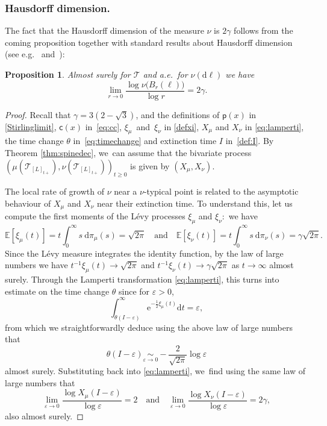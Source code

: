 \documentclass[JEP,XML,SOM,Unicode,NoFloatCountersInSection, NoEqCountersInSection,published]{cedram}
\let\dH\gamma
\newcommand{\pp}{\mathsf{p}}
\newcommand{\cc}{\mathsf{c}}\let\ff\cc
\newcommand{\T}{\mathcal{T}}\let\CRT\T\let\tbr\T
\let\veps\varepsilon
\newtheorem{prop}[thm]{Proposition}
\theoremstyle{definition}
\begin{document}
\subsubsection*{Hausdorff dimension.}

The fact that the Hausdorff dimension of the measure $\nu$ is $2 \dH$ follows from the coming proposition together with standard results about Hausdorff dimension (see e.g.~\cite[Lem.\,4.1]{lyons1995ergodic} and~\cite[\S 14]{billingsley1965}):

\begin{prop}\label{prop:continuous Hausdorff} Almost surely for $\mathcal{T}$ and a.e.\ for $\nu(\mathrm{d}\ell)$ we have
\[
\lim_{r \to 0} \frac{\log \nu \big(B_r(\ell)\big) }{\log r} = 2 \dH.
\]
\end{prop}

\begin{proof}
Recall that $\gamma=3(2-\sqrt{3})$, and the definitions of $\pp(x)$ in \eqref{Stirlinglimit}, $\cc(x)$ in~\eqref{eq:cc}, $\xi_\mu$~and~$\xi_\nu$ in \eqref{defxi}, $X_\mu$ and $X_\nu$ in \eqref{eq:lamperti}, the time change $\theta$ in~\eqref{eq:timechange} and extinction time $I$ in~\eqref{def:I}. By Theorem \ref{thm:spinedec}, we~can assume that the bivariate process $(\mu(\T_{[L]_{t+}}),\nu(\T_{[L]_{t+}}))_{t\geq 0}$ is given by $(X_\mu,X_\nu)$.

The local rate of growth of $\nu$ near a $\nu$-typical point is related to the asymptotic behaviour of $X_\mu$ and $X_\nu$ near their extinction time. To understand this, let us compute the first moments of the Lévy processes $\xi_\mu$ and $\xi_\nu:$ we have
\[
\mathbb{E}[\xi_\mu(t)] = t \int_0^{\infty} s\ \mathrm{d}\pi_\mu(s) = \sqrt{2 \pi} \quad \text{and}\quad \mathbb{E}[\xi_\nu(t)] = t \int_0^{\infty} s\ \mathrm{d}\pi_\nu(s) = \dH \sqrt{2\pi}.
\]
Since the Lévy measure integrates the identity function, by the law of large numbers we have $t^{-1}\xi_\mu (t) \to \sqrt{2 \pi}$ and $t^{-1}\xi_\nu (t) \to \dH \sqrt{2\pi}$ as $t \to \infty$ almost surely. Through the Lamperti transformation \eqref{eq:lamperti}, this turns into estimate on the time change $\theta$ since for $\veps>0$,
\[
\int_{\theta(I-\veps)}^{\infty} \mathrm{e}^{-\frac12 \xi_\mu(t)}\mathrm dt=\veps,
\]
from which we straightforwardly deduce using the above law of large numbers that
\[
\theta(I-\veps)\underset{\veps\to 0}\sim-\frac2{\sqrt{2\pi}}\log \veps
\]
almost surely. Substituting back into \eqref{eq:lamperti}, we~find using the same law of large numbers that
\[
\lim_{ \varepsilon \to 0}\frac{\log X_\mu(I - \varepsilon)}{\log \varepsilon} =2\quad \text{and} \quad \lim_{ \varepsilon \to 0}\frac{\log X_\nu(I - \varepsilon)}{\log \varepsilon} = 2\dH,
\]
also almost surely.


\end{proof}
\end{document}
